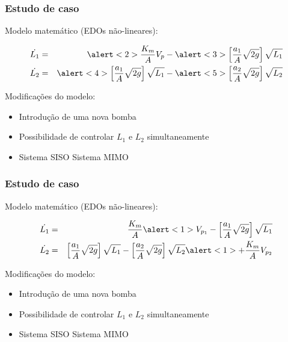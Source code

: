 \documentclass{beamer}
\begin{document}
\begin{frame}
    \frametitle{Estudo de caso}

    Modelo matemático (EDOs não-lineares):

\begin{eqnarray}
\dot{L_1} & = & \alert<2>{\frac{K_m}{A}V_p} -
                \alert<3>{\left[\frac{a_1}{A}\sqrt{2g}\right]\sqrt{L_1}}
\nonumber\\
\dot{L_2} & = & \alert<4>{\left[\frac{a_1}{A}\sqrt{2g}\right]\sqrt{L_1}} -
                \alert<5>{\left[\frac{a_2}{A}\sqrt{2g}\right]\sqrt{L_2}}
\nonumber
\end{eqnarray}

{
    Modificações do modelo:

\begin{itemize}
    \item Introdução de uma nova bomba
    \item Possibilidade de controlar $L_1$ e $L_2$ simultaneamente
    \item Sistema SISO \implica Sistema MIMO
\end{itemize}
}

\end{frame}

\begin{frame}
    \frametitle{Estudo de caso}

    Modelo matemático (EDOs não-lineares):

\begin{eqnarray}
\dot{L_1} & = & \frac{K_m}{A}\alert<1>{V_{p_{\tiny 1}}} -
                \left[\frac{a_1}{A}\sqrt{2g}\right]\sqrt{L_1}
\nonumber\\
\dot{L_2} & = & \left[\frac{a_1}{A}\sqrt{2g}\right]\sqrt{L_1} -
                \left[\frac{a_2}{A}\sqrt{2g}\right]\sqrt{L_2}
                \alert<1>{+ \frac{K_m}{A}V_{p_{\tiny 2}}}
\nonumber
\end{eqnarray}

    Modificações do modelo:

\begin{itemize}
    \item Introdução de uma nova bomba
    \item Possibilidade de controlar $L_1$ e $L_2$ simultaneamente
    \item Sistema SISO \implica Sistema MIMO
\end{itemize}
\end{frame}
\end{document}
